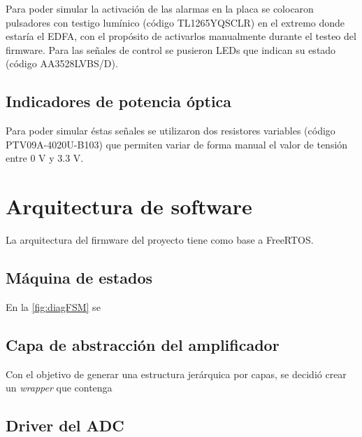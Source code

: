 Para poder simular la activación de las alarmas en la placa se colocaron pulsadores con testigo lumínico (código TL1265YQSCLR) en el extremo donde estaría el EDFA, con el propósito de activarlos manualmente durante el testeo del firmware. Para las señales de control se pusieron LEDs que indican su estado (código AA3528LVBS/D).

\subsection{Indicadores de potencia óptica}


Para poder simular éstas señales se utilizaron dos resistores variables (código PTV09A-4020U-B103) que permiten variar de forma manual el valor de tensión entre 0 V y 3.3 V.

\section{Arquitectura de software}

La arquitectura del firmware del proyecto tiene como base a FreeRTOS.

\subsection{Máquina de estados}

En la \ref{fig:diagFSM} se


\subsection{Capa de abstracción del amplificador}

Con el objetivo de generar una estructura jerárquica por capas, se decidió crear un \textit{wrapper} que contenga  

\subsection{Driver del ADC}

